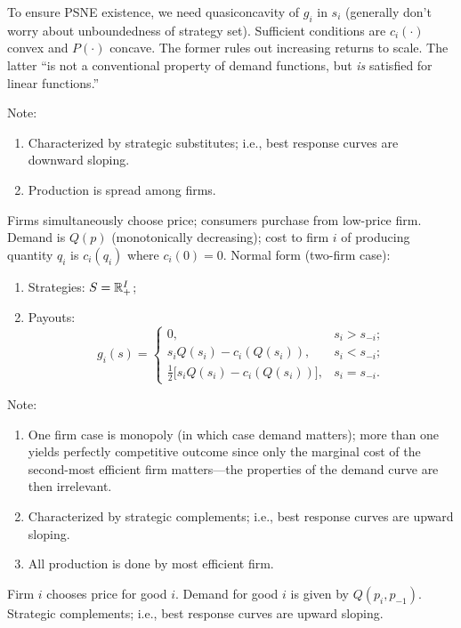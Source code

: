 \documentclass[8pt,letterpaper, landscape]{extarticle} %
\begin{document}
\begin{multicols}{3}
\begin{description}
To ensure PSNE existence, we need quasiconcavity of $ g_i $ in $ s_i $ (generally don't worry about unboundedness of strategy set). Sufficient conditions are $ c_i (\cdot) $ convex and $ P (\cdot) $ concave. The former rules out increasing returns to scale. The latter ``is not a conventional property of demand functions, but \textit{is} satisfied for linear functions.''

Note:
\begin{enumerate}
\item Characterized by strategic substitutes; i.e., best response curves are downward sloping.
\item Production is spread among firms.
\end{enumerate}

 Firms simultaneously choose price; consumers purchase from low-price firm. Demand is $ Q(p) $ (monotonically decreasing); cost to firm $ i $ of producing quantity $ q_i $ is $ c_i (q_i) $ where $ c_i (0) = 0 $. Normal form (two-firm case):
\begin{enumerate}
\item Strategies: $ S = \mathbb{R}_{+}^{I} $;
\item Payouts:
$$ g_i (s) = \begin{cases}
0, & s_i > s_{-i}; \\
s_i Q(s_i) - c_i (Q(s_i)), & s_i < s_{-i}; \\
\tfrac{1}{2} \bigl [s_i Q(s_i) - c_i (Q(s_i)) \bigr ], & s_i = s_{-i} .
\end{cases}
$$
\end{enumerate}
Note:
\begin{enumerate}
\item One firm case is monopoly (in which case demand matters); more than one yields perfectly competitive outcome since only the marginal cost of the second-most efficient firm matters---the properties of the demand curve are then irrelevant.
\item Characterized by strategic complements; i.e., best response curves are upward sloping.
\item All production is done by most efficient firm.
\end{enumerate}

 Firm $ i $ chooses price for good $ i $. Demand for good $ i $ is given by $ Q(p_{i}, p_{-1}) $. Strategic complements; i.e., best response curves are upward sloping.


\end{description}
\end{multicols}
\end{document}
